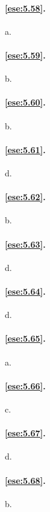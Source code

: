 \paragraph{\ref{ese:5.58}.}
a.

\paragraph{\ref{ese:5.59}.}
b.

\paragraph{\ref{ese:5.60}.}
b.

\paragraph{\ref{ese:5.61}.}
d.

\paragraph{\ref{ese:5.62}.}
b.

\paragraph{\ref{ese:5.63}.}
d.

\paragraph{\ref{ese:5.64}.}
d.

\paragraph{\ref{ese:5.65}.}
a.

\paragraph{\ref{ese:5.66}.}
c.

\paragraph{\ref{ese:5.67}.}
d.

\paragraph{\ref{ese:5.68}.}
b.

\endgroup
